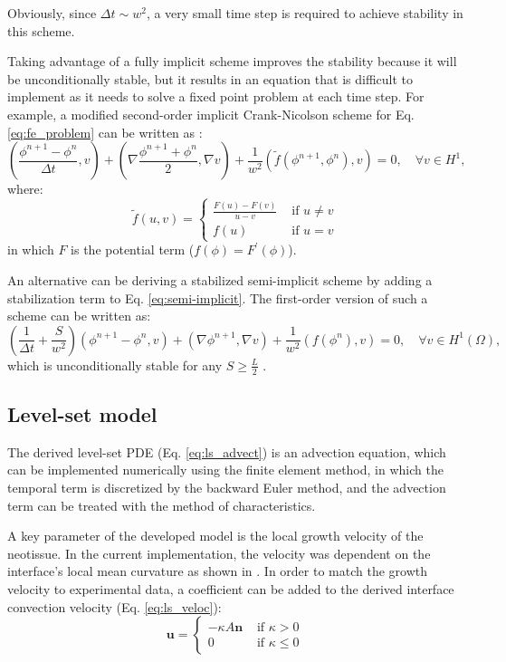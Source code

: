 Obviously, since $\Delta t \sim w^2$, a very small time step is required to achieve stability in this scheme.

Taking advantage of a fully implicit scheme improves the stability because it will be unconditionally stable, but it results in an equation that is difficult to implement as it needs to solve a fixed point problem at each time step. For example, a modified second-order implicit Crank-Nicolson scheme for Eq. \ref{eq:fe_problem} can be written as \cite{Abboud2019,Elliott1989}:
\begin{equation}
\left(\frac{\phi^{n+1}-\phi^{n}}{\Delta t}, v\right)+\left(\nabla \frac{\phi^{n+1}+\phi^{n}}{2}, \nabla v\right)+\frac{1}{w^{2}}\left(\tilde{f}\left(\phi^{n+1}, \phi^{n}\right), v\right)=0, \quad \forall v \in H^{1},
\end{equation}
where:
\begin{equation}
\tilde{f}(u, v)=\left\{\begin{array}{ll}
\frac{F(u)-F(v)}{u-v} & \text { if } u \neq v \\
f(u) & \text { if } u=v
\end{array}\right.
\end{equation}
in which $F$ is the potential term ($f(\phi)=F^{\prime}(\phi)$).

An alternative can be deriving a stabilized semi-implicit scheme by adding a stabilization term to Eq. \ref{eq:semi-implicit}. The first-order version of such a scheme can be written as:
\begin{equation}
\left(\frac{1}{\Delta t}+\frac{S}{w^{2}}\right)\left(\phi^{n+1}-\phi^{n}, v\right)+\left(\nabla \phi^{n+1}, \nabla v\right)+\frac{1}{w^{2}}\left(f\left(\phi^{n}\right), v\right)=0, \quad \forall v \in H^{1}(\Omega),
\end{equation}
which is unconditionally stable for any $S \geq \frac{L}{2}$ \cite{Shen2010}.


\subsection{Level-set model}

The derived level-set \gls{PDE} (Eq. \ref{eq:ls_advect}) is an advection equation, which can be implemented numerically using the finite element method, in which the temporal term is discretized by the backward Euler method, and the advection term can be treated with the method of characteristics.

A key parameter of the developed model is the local growth velocity of the neotissue. In the current implementation, the velocity was dependent on the interface's local mean curvature as shown in \cite{Bidan2012a,Guyot2014}. In order to match the growth velocity to experimental data, a coefficient can be added to the derived interface convection velocity (Eq. \ref{eq:ls_veloc}):
\begin{equation} \label{eq:ls_veloc2}
\boldsymbol{u}=\left\{\begin{array}{ll}
-\kappa A \boldsymbol{n} & \text { if } \kappa>0 \\
0 & \text { if } \kappa \leq 0
\end{array}\right.
\end{equation}

